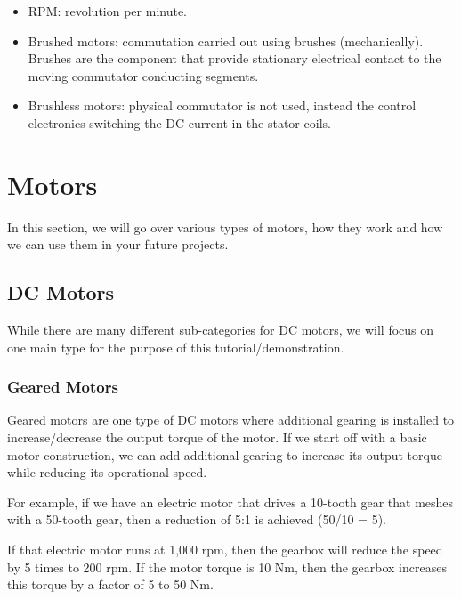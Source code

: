 \documentclass[paper=a4, fontsize=11pt]{article} %
\providecommand{\tightlist}{%
  \setlength{\itemsep}{0pt}\setlength{\parskip}{0pt}}
\numberwithin{equation}{section} %
\numberwithin{figure}{section} %
\numberwithin{table}{section} %
\begin{document}

\begin{itemize}
\tightlist
\item
  RPM: revolution per minute.
\item
  Brushed motors: commutation carried out using brushes (mechanically).
  Brushes are the component that provide stationary electrical contact
  to the moving commutator conducting segments.
\item
  Brushless motors: physical commutator is not used, instead the control
  electronics switching the DC current in the stator coils.
\end{itemize}

\hypertarget{motors}{%
\section{Motors}\label{motors}}

In this section, we will go over various types of motors, how they work
and how we can use them in your future projects.

\hypertarget{dc-motors}{%
\subsection{DC Motors}\label{dc-motors}}

While there are many different sub-categories for DC motors, we will
focus on one main type for the purpose of this tutorial/demonstration.

\hypertarget{geared-motors}{%
\subsubsection{Geared Motors}\label{geared-motors}}

Geared motors are one type of DC motors where additional gearing is
installed to increase/decrease the output torque of the motor. If we
start off with a basic motor construction, we can add additional gearing
to increase its output torque while reducing its operational speed.

For example, if we have an electric motor that drives a 10-tooth gear
that meshes with a 50-tooth gear, then a reduction of 5:1 is achieved
(50/10 = 5).

If that electric motor runs at 1,000 rpm, then the gearbox will reduce
the speed by 5 times to 200 rpm. If the motor torque is 10 Nm, then the
gearbox increases this torque by a factor of 5 to 50 Nm.
\end{document}
